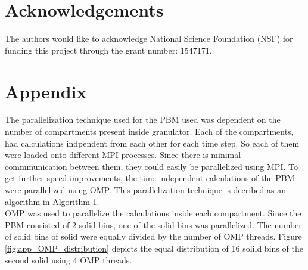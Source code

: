 \documentclass[preprint,11pt,authoryear]{elsarticle}
\begin{document}
\section{Acknowledgements}
The authors would like to acknowledge National Science Foundation (NSF) for 
funding this project
through the grant number: 1547171.
\section*{Appendix}
The parallelization technique used for the PBM used was dependent on the number of compartments present inside 
granulator. Each of the compartments, had calculations indpendent from each other for each time step. So each of them were
loaded onto different MPI processes. Since there is minimal commmunication between them, they could easily be parallelized using MPI. 
To get further speed improvements, the time independent calculations of the PBM were parallelized using OMP. 
This parallelization technique is decribed as an algorithm in Algorithm 1. \\
OMP was used to parallelize the calculations inside each compartment. Since the PBM consisted of 2 solid bins, one of 
the solid bins was parallelized. The number of solid bins of solid were equally divided by the number of OMP threads. 
Figure \ref{fig:app_OMP_distribution} depicts the equal distribution of 16 solild bins of the second solid using 4 OMP 
threads.
\end{document}
